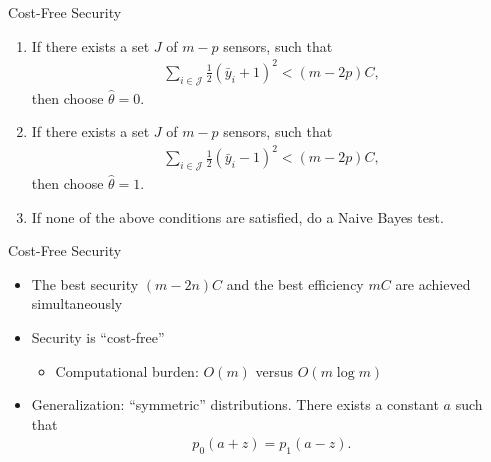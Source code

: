 \documentclass[10pt]{beamer}
\begin{document}
\begin{frame}{Cost-Free Security}
  \begin{enumerate}
  \item If there exists a set $J$ of $m-p$ sensors, such that
    \begin{align*}
      \sum_{i\in \mathcal J}\frac{1}{2}(\bar y_i+1)^2 < (m-2p)C,
    \end{align*}
    then choose $\hat \theta = 0$. 
  \item If there exists a set $J$ of $m-p$ sensors, such that
    \begin{align*}
      \sum_{i\in \mathcal J}\frac{1}{2}(\bar y_i-1)^2 < (m-2p)C,
    \end{align*}
    then choose $\hat \theta = 1$. 
  \item If none of the above conditions are satisfied, do a Naive Bayes test.
  \end{enumerate}
\end{frame}

\begin{frame}{Cost-Free Security}
  \begin{itemize}
  \item The best security $(m-2n)C$ and the best efficiency $mC$ are achieved simultaneously
  \item Security is ``cost-free''
    \begin{itemize}
    \item Computational burden: $O(m)$ versus $O(m\log m)$
    \end{itemize}
  \item Generalization: ``symmetric'' distributions. There exists a constant $a$ such that 
    \begin{align*}
      p_0(a+z) = p_1(a-z).
    \end{align*}
  \end{itemize}
\end{frame}
\end{document}

